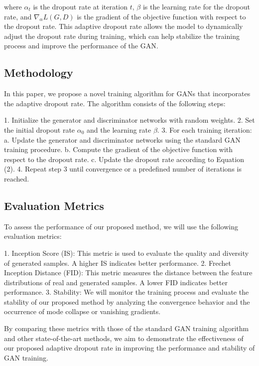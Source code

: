 where $\alpha_t$ is the dropout rate at iteration $t$, $\beta$ is the learning rate for the dropout rate, and $\nabla_\alpha L(G, D)$ is the gradient of the objective function with respect to the dropout rate. This adaptive dropout rate allows the model to dynamically adjust the dropout rate during training, which can help stabilize the training process and improve the performance of the GAN.

\subsection{Methodology}
In this paper, we propose a novel training algorithm for GANs that incorporates the adaptive dropout rate. The algorithm consists of the following steps:

1. Initialize the generator and discriminator networks with random weights.
2. Set the initial dropout rate $\alpha_0$ and the learning rate $\beta$.
3. For each training iteration:
   a. Update the generator and discriminator networks using the standard GAN training procedure.
   b. Compute the gradient of the objective function with respect to the dropout rate.
   c. Update the dropout rate according to Equation (2).
4. Repeat step 3 until convergence or a predefined number of iterations is reached.

\subsection{Evaluation Metrics}
To assess the performance of our proposed method, we will use the following evaluation metrics:

1. Inception Score (IS): This metric is used to evaluate the quality and diversity of generated samples. A higher IS indicates better performance.
2. Frechet Inception Distance (FID): This metric measures the distance between the feature distributions of real and generated samples. A lower FID indicates better performance.
3. Stability: We will monitor the training process and evaluate the stability of our proposed method by analyzing the convergence behavior and the occurrence of mode collapse or vanishing gradients.

By comparing these metrics with those of the standard GAN training algorithm and other state-of-the-art methods, we aim to demonstrate the effectiveness of our proposed adaptive dropout rate in improving the performance and stability of GAN training.
